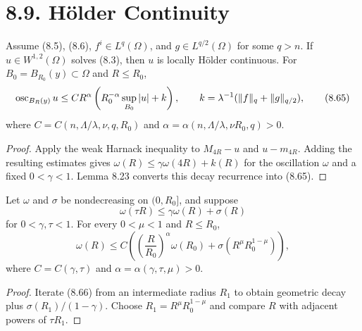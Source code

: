 \section*{8.9. H\"older Continuity}

\begin{theorem}
\label{gt-thm-8-22-interior-holder}
Assume (8.5), (8.6), $f^i\in L^q(\Omega)$, and
$g\in L^{q/2}(\Omega)$ for some $q>n$. If $u\in W^{1,2}(\Omega)$ solves
(8.3), then $u$ is locally H\"older continuous. For
$B_0=B_{R_0}(y)\subset\Omega$ and $R\leq R_0$,
\begin{equation}
\operatorname{osc}_{B_R(y)}u\leq CR^\alpha
\left(R_0^{-\alpha}\sup_{B_0}|u|+k\right),
\qquad k=\lambda^{-1}(\|f\|_q+\|g\|_{q/2}),
\tag{8.65}
\end{equation}
where $C=C(n,\Lambda/\lambda,\nu,q,R_0)$ and
$\alpha=\alpha(n,\Lambda/\lambda,\nu R_0,q)>0$.
\end{theorem}
\begin{proof}
\sketch Apply the weak Harnack inequality to
$M_{4R}-u$ and $u-m_{4R}$. Adding the resulting estimates gives
$\omega(R)\leq\gamma\omega(4R)+k(R)$ for the oscillation $\omega$ and a fixed
$0<\gamma<1$. Lemma 8.23 converts this decay recurrence into (8.65).
\end{proof}

\begin{lemma}
\label{gt-lem-8-23-oscillation-iteration}
Let $\omega$ and $\sigma$ be nondecreasing on $(0,R_0]$, and suppose
\begin{equation}
\omega(\tau R)\leq\gamma\omega(R)+\sigma(R)
\tag{8.66}
\end{equation}
for $0<\gamma,\tau<1$. For every $0<\mu<1$ and $R\leq R_0$,
\begin{equation}
\omega(R)\leq C\left(
\left(\frac R{R_0}\right)^\alpha\omega(R_0)
+\sigma(R^\mu R_0^{1-\mu})\right),
\tag{8.67}
\end{equation}
where $C=C(\gamma,\tau)$ and $\alpha=\alpha(\gamma,\tau,\mu)>0$.
\end{lemma}
\begin{proof}
\sketch Iterate (8.66) from an intermediate radius $R_1$ to obtain geometric
decay plus $\sigma(R_1)/(1-\gamma)$. Choose
$R_1=R^\mu R_0^{1-\mu}$ and compare $R$ with adjacent powers of $\tau R_1$.
\end{proof}

